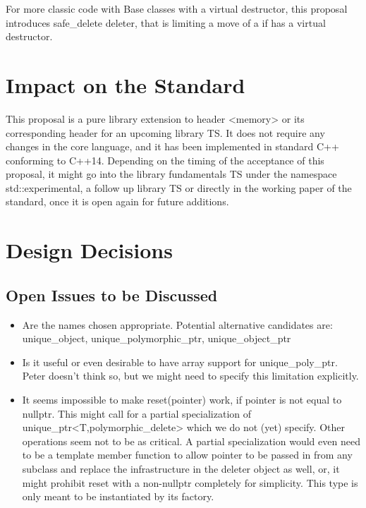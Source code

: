 \documentclass[ebook,11pt,article]{memoir}
\begin{document}
For more classic code with Base classes with a virtual destructor, this proposal introduces safe_delete deleter, that is limiting a  move of a  if  has a virtual destructor.

\chapter{Impact on the Standard}
This proposal is a pure library extension to header <memory> or its corresponding header for an upcoming library TS.  It does not require any changes in the core language, and it has been implemented in standard C++ conforming to C++14. Depending on the timing of the acceptance of this proposal, it might go into the library fundamentals TS under the namespace std::experimental, a follow up library TS or directly in the working paper of the standard, once it is open again for future additions.

\chapter{Design Decisions}

\section{Open Issues to be Discussed}
\begin{itemize}
\item Are the names chosen appropriate. Potential alternative candidates are: unique_object, unique_polymorphic_ptr, unique_object_ptr
\item Is it useful or even desirable to have array support for unique_poly_ptr. Peter doesn't think so, but we might need to specify this limitation explicitly.
\item It seems impossible to make reset(pointer) work, if pointer is not equal to nullptr. This might call for a partial specialization of unique_ptr<T,polymorphic_delete> which we do not (yet) specify. Other operations seem not to be as critical. A partial specialization would even need to be a template member function to allow pointer to be passed in from any subclass and replace the infrastructure in the deleter object as well, or, it might prohibit reset with a non-nullptr completely for simplicity. This type is only meant to be instantiated by its factory.
\end{itemize}
\end{document}
